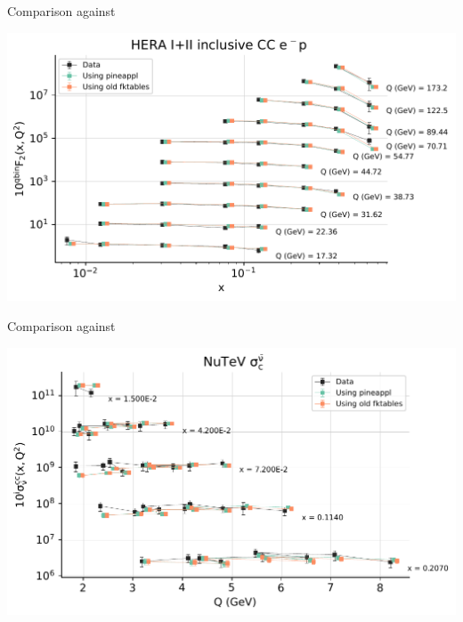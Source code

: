\documentclass[9pt]{beamer}
\begin{document}
\section{\yadism}
\begin{frame}{Comparison \yadism{} against \apfel{}}
	\begin{center}
		\includegraphics[width=\linewidth]{matched_datasets_from_dataspecs4_dataset_report_plot_fancy_dataspecs_0.pdf}
	\end{center}
\end{frame}
\begin{frame}{Comparison \yadism{} against \apfel{}}
	\begin{center}
		\includegraphics[width=\linewidth]{matched_datasets_from_dataspecs6_dataset_report_plot_fancy_dataspecs_0.pdf}
	\end{center}
\end{frame}
\end{document}
